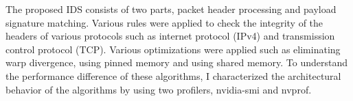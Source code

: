 The proposed IDS consists of two parts, packet header processing and payload signature matching. Various rules were applied to check the integrity of the headers of various protocols such as internet protocol (IPv4) and transmission control protocol (TCP). Various optimizations were applied such as eliminating warp divergence, using pinned memory and using shared memory. To understand the performance difference of these algorithms, I characterized the architectural behavior of the algorithms by using two profilers, nvidia-smi and nvprof. 